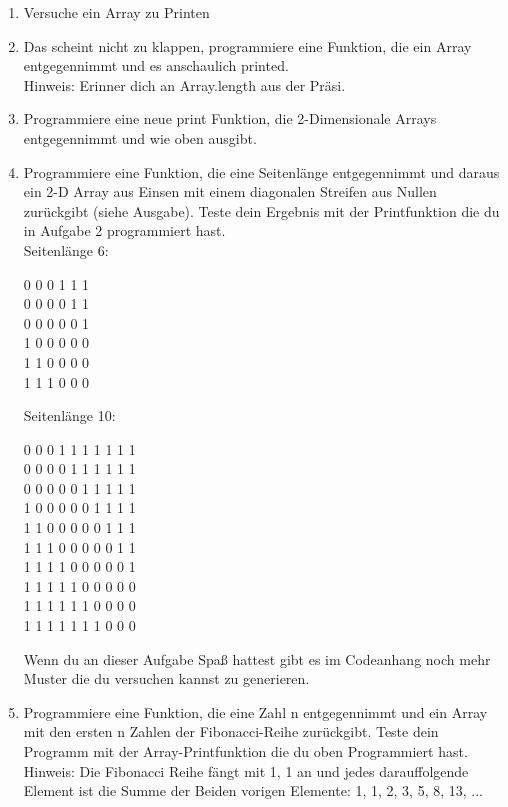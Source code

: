 \documentclass{../../sheet}
\begin{document}
\begin{enumerate}
    \item Versuche ein Array zu Printen
    \item Das scheint nicht zu klappen, programmiere eine Funktion, die ein Array entgegennimmt und es anschaulich printed.\\
    Hinweis: Erinner dich an Array.length aus der Präsi.
    \item Programmiere eine neue print Funktion, die 2-Dimensionale Arrays entgegennimmt und wie oben ausgibt. 
    \item Programmiere eine Funktion, die eine Seitenlänge entgegennimmt und daraus ein 2-D Array aus Einsen mit einem diagonalen Streifen aus Nullen zurückgibt (siehe Ausgabe). Teste dein Ergebnis mit der Printfunktion die du in Aufgabe 2 programmiert hast.\\
    Seitenlänge 6:
    \begin{ausgabe}
0 0 0 1 1 1\\
0 0 0 0 1 1\\ 
0 0 0 0 0 1\\ 
1 0 0 0 0 0\\ 
1 1 0 0 0 0\\ 
1 1 1 0 0 0
    \end{ausgabe}
    Seitenlänge 10:
    \begin{ausgabe}
0 0 0 1 1 1 1 1 1 1 \\
0 0 0 0 1 1 1 1 1 1 \\
0 0 0 0 0 1 1 1 1 1 \\
1 0 0 0 0 0 1 1 1 1 \\
1 1 0 0 0 0 0 1 1 1 \\
1 1 1 0 0 0 0 0 1 1 \\
1 1 1 1 0 0 0 0 0 1 \\
1 1 1 1 1 0 0 0 0 0 \\
1 1 1 1 1 1 0 0 0 0 \\
1 1 1 1 1 1 1 0 0 0
    \end{ausgabe}
    Wenn du an dieser Aufgabe Spaß hattest gibt es im Codeanhang noch mehr Muster die du versuchen kannst zu generieren.
    \item Programmiere eine Funktion, die eine Zahl n entgegennimmt und ein Array mit den ersten n Zahlen der Fibonacci-Reihe zurückgibt. Teste dein Programm mit der Array-Printfunktion die du oben Programmiert hast.\\
    Hinweis: Die Fibonacci Reihe fängt mit 1, 1 an und jedes darauffolgende Element ist die Summe der Beiden vorigen Elemente: 1, 1, 2, 3, 5, 8, 13, ...

\end{enumerate}
\end{document}

